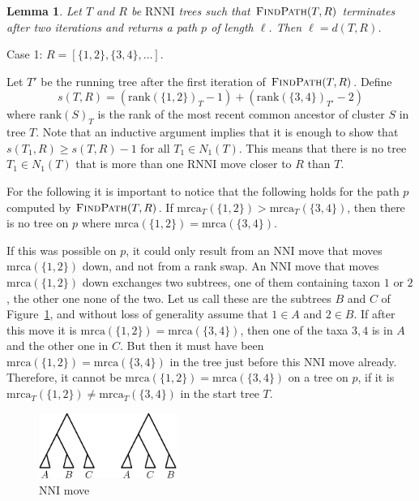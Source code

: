 \documentclass{amsart}
\newtheorem{lemma}{Lemma}
\newcommand{\rnni}{\mathrm{RNNI}}
\newcommand{\findpath}{\textsc{FindPath}}
\newcommand{\mrca}{\mathrm{mrca}}
\newcommand{\rank}{\mathrm{rank}}
\newcommand{\nni}{\mathrm{NNI}}
\begin{document}
\endproof

\begin{lemma}
Let $T$ and $R$ be $\rnni$ trees such that $\findpath(T, R)$ terminates after two iterations and returns a path $p$ of length $\ell$.
Then $\ell = d(T, R)$.
\end{lemma}

\proof
Case 1: $R = [\{1, 2\}, \{3, 4\}, \ldots]$.

Let $T'$ be the running tree after the first iteration of $\findpath(T, R)$.
Define
\[
s(T, R) = (\rank(\{1,2\})_T - 1) + (\rank(\{3,4\})_{T'} - 2)
\]
where $\rank(S)_T$ is the rank of the most recent common ancestor of cluster $S$ in tree $T$.
Note that an inductive argument implies that it is enough to show that $s(T_1, R) \geq s(T, R) - 1$ for all $T_1 \in N_1(T)$.
This means that there is no tree $T_1 \in N_1(T)$ that is more than one $\rnni$ move closer to $R$ than $T$.

For the following it is important to notice that the following holds for the path $p$ computed by $\findpath(T,R)$.
If $\mrca_T(\{1,2\}) > \mrca_T(\{3,4\})$, then there is no tree on $p$ where $\mrca(\{1,2\}) = \mrca(\{3,4\})$.

If this was possible on $p$, it could only result from an $\nni$ move that moves $\mrca(\{1,2\})$ down, and not from a rank swap.
An $\nni$ move that moves $\mrca(\{1,2\})$ down exchanges two subtrees, one of them containing taxon $1$ or $2$, the other one none of the two.
Let us call these are the subtrees $B$ and $C$ of Figure~\ref{fig:nni_move}, and without loss of generality assume that $1 \in A$ and $2 \in B$.
If after this move it is $\mrca(\{1,2\}) = \mrca(\{3,4\})$, then one of the taxa $3,4$ is in $A$ and the other one in $C$.
But then it must have been $\mrca(\{1,2\}) = \mrca(\{3,4\})$ in the tree just before this $\nni$ move already.
Therefore, it cannot be $\mrca(\{1,2\}) = \mrca(\{3,4\})$ on a tree on $p$, if it is $\mrca_T(\{1,2\}) \neq \mrca_T(\{3,4\})$ in the start tree $T$.


\begin{figure}[H]
\centering
\includegraphics[width=0.4\textwidth]{NNI_move}
\vspace{12pt}
\caption{$\nni$ move}
\label{fig:nni_move}
\end{figure}
\end{document}
